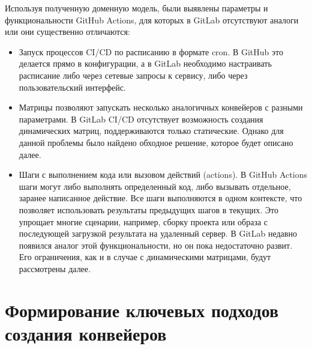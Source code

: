 Используя полученную доменную модель, были выявлены параметры и функциональности GitHub Actions, для которых в GitLab отсутствуют аналоги или они существенно отличаются:
\begin{itemize}
  \item Запуск процессов CI/CD по расписанию в формате cron.
        В GitHub это делается прямо в конфигурации, а в GitLab необходимо настраивать расписание либо через сетевые запросы к сервису,
        либо через пользовательский интерфейс.
  \item Матрицы позволяют запускать несколько аналогичных конвейеров с разными параметрами.
        В GitLab CI/CD отсутствует возможность создания динамических матриц, поддерживаются только статические.
        Однако для данной проблемы было найдено обходное решение, которое будет описано далее.
  \item Шаги с выполнением кода или вызовом действий (actions).
        В GitHub Actions шаги могут либо выполнять определенный код, либо вызывать отдельное, заранее написанное действие.
        Все шаги выполняются в одном контексте, что позволяет использовать результаты предыдущих шагов в текущих.
        Это упрощает многие сценарии, например, сборку проекта или образа с последующей загрузкой результата на удаленный сервер.
        В GitLab недавно появился аналог этой функциональности, но он пока недостаточно развит.
        Его ограничения, как и в случае с динамическими матрицами, будут рассмотрены далее.
\end{itemize}

\section{Формирование ключевых подходов создания конвейеров} \label{sec:gitlab-pipelines-key-principles}
